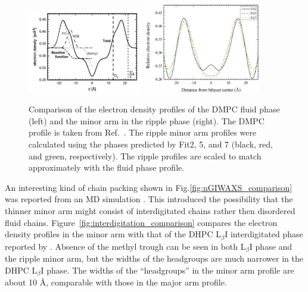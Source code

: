 \begin{figure}[htbp]
  \centering
  \includegraphics[width=0.45\textwidth]{figures/ripple/discussion/Kucerka_fluid_DMPC}
  \includegraphics[width=0.45\textwidth]{figures/ripple/discussion/minor_edp}
  \caption{Comparison of the electron density profiles of the DMPC fluid phase (left)
  and the minor arm in the ripple phase (right). The DMPC profile is taken from 
  Ref.~\cite{Kucerka05_BPJ}. The ripple minor arm profiles were calculated 
  using the phases predicted by Fit2, 5, and 7 (black, red, and green, respectively). 
  The ripple profiles are scaled to match approximately
  with the fluid phase profile.}
  \label{fig:fluid_comparison}
\end{figure}


An interesting kind of chain packing shown in Fig.\ref{fig:nGIWAXS_comparison} 
was reported from an MD simulation \cite{ref:deVries05}. This introduced the 
possibility that the thinner minor arm might consist of interdigitated chains 
rather then disordered fluid chains.  
Figure~\ref{fig:interdigitation_comparison} compares the electron density
profiles in the minor arm with that of the DHPC L$_\beta\text{I}$ interdigitated phase
reported by \cite{ref:Guler09}. Absence of the methyl trough can be seen in
both L$_\beta\text{I}$ phase and the ripple minor arm, but the widths of the
headgroups are much narrower in the DHPC L$_\beta\text{I}$ phase. The widths
of the ``headgroups'' in the minor arm profile are about 10 \AA, comparable
with those in the major arm profile.

